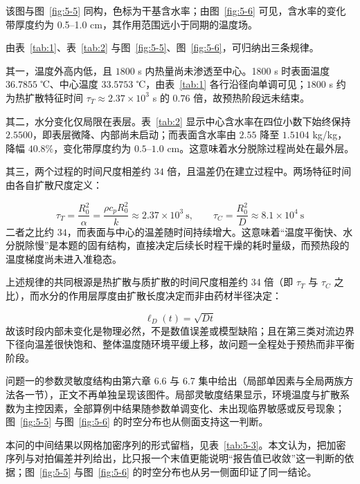 该图与图~\ref{fig:5-5} 同构，色标为干基含水率；由图~\ref{fig:5-6} 可见，含水率的变化带厚度约为 0.5–1.0 cm，其作用范围远小于同期的温度场。

由表~\ref{tab:1}、表~\ref{tab:2} 与图~\ref{fig:5-5}、图~\ref{fig:5-6}，可归纳出三条规律。

其一，温度外高内低，且 $1800$ s 内热量尚未渗透至中心。1800 s 时表面温度 $36.7855$ ℃、中心温度 $33.5753$ ℃，由表~\ref{tab:1} 各行沿径向单调可见；$1800$ s 约为热扩散特征时间 $\tau_T\approx2.37\times10^{3}$ s 的 $0.76$ 倍，故预热阶段远未结束。

其二，水分变化仅局限在表层。表~\ref{tab:2} 显示中心含水率在四位小数下始终保持 $2.5500$，即表层微降、内部尚未启动；而表面含水率由 $2.55$ 降至 $1.5104$ kg/kg，降幅 $40.8\%$，变化带厚度约为 $0.5$–$1.0$ cm。这意味着水分脱除过程尚处在最外层。

其三，两个过程的时间尺度相差约 $34$ 倍，且温差仍在建立过程中。两场特征时间由各自扩散尺度定义：

\begin{equation}
  \tau_T=\frac{R_0^2}{\alpha}=\frac{\rho c_pR_0^2}{k}\approx2.37\times10^{3}\ \mathrm s,\qquad \tau_C=\frac{R_0^2}{D}\approx8.1\times10^{4}\ \mathrm s
  \label{eq:5-16}
\end{equation}
二者之比约 $34$，而表面与中心的温差随时间持续增大。这意味着“温度平衡快、水分脱除慢”是本题的固有结构，直接决定后续长时程干燥的耗时量级，而预热段的温度梯度尚未进入准稳态。

上述规律的共同根源是热扩散与质扩散的时间尺度相差约 34 倍（即 $\tau_T$ 与 $\tau_C$ 之比），而水分的作用层厚度由扩散长度决定而非由药材半径决定：

\begin{equation}
  \ell_D(t)=\sqrt{Dt}
  \label{eq:5-17}
\end{equation}
故该时段内部未变化是物理必然，不是数值误差或模型缺陷；且在第三类对流边界下径向温差很快饱和、整体温度随环境平缓上移，故问题一全程处于预热而非平衡阶段。

问题一的参数灵敏度结构由第六章 6.6 与 6.7 集中给出（局部单因素与全局两族方法各一节），正文不再单独呈现该图件。局部灵敏度结果显示，环境温度与扩散系数为主控因素，全部算例中结果随参数单调变化、未出现临界敏感或反号现象；图~\ref{fig:5-5} 与图~\ref{fig:5-6} 的时空分布也从侧面支持这一判断。

本问的中间结果以网格加密序列的形式留档，见表~\ref{tab:5-3}。本文认为，把加密序列与对拍偏差并列给出，比只报一个末值更能说明“报告值已收敛”这一判断的依据；图~\ref{fig:5-5} 与图~\ref{fig:5-6} 的时空分布也从另一侧面印证了同一结论。



